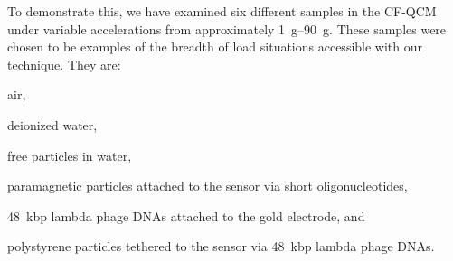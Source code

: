 To demonstrate this, we have examined six different samples in the CF-QCM
under variable accelerations from approximately \SIrange{1}{90}{g}.  These
samples were chosen to be examples of the breadth of load situations
accessible with our technique.  They are:
\begin{inparaenum}[(a)]
\item air,
\item deionized water,
\item free particles in water,
\item paramagnetic particles attached to the sensor via short oligonucleotides,
\item \SI{48}{kbp} lambda phage DNAs attached to the gold electrode, and
\item polystyrene particles tethered to the sensor via \SI{48}{kbp} lambda phage DNAs.
\end{inparaenum}

